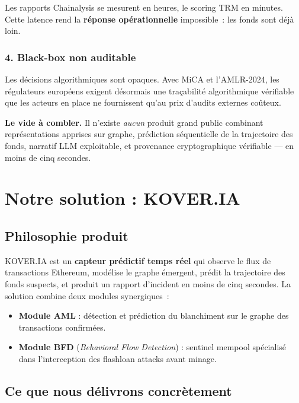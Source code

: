 \documentclass[11pt,a4paper]{article}
\begin{document}
Les rapports Chainalysis se mesurent en heures, le scoring TRM en
minutes. Cette latence rend la \textbf{réponse opérationnelle}
impossible~: les fonds sont déjà loin.

\subsubsection{4. Black-box non auditable}

Les décisions algorithmiques sont opaques. Avec MiCA et l'AMLR-2024,
les régulateurs européens exigent désormais une traçabilité
algorithmique vérifiable que les acteurs en place ne fournissent qu'au
prix d'audits externes coûteux.

\begin{insight}
\textbf{Le vide à combler.} Il n'existe \emph{aucun} produit grand
public combinant représentations apprises sur graphe, prédiction
séquentielle de la trajectoire des fonds, narratif LLM exploitable,
et provenance cryptographique vérifiable --- en moins de cinq secondes.
\end{insight}

\section{Notre solution : KOVER.IA}

\subsection{Philosophie produit}

\textsc{KOVER.IA} est un \textbf{capteur prédictif temps réel} qui
observe le flux de transactions Ethereum, modélise le graphe émergent,
prédit la trajectoire des fonds suspects, et produit un rapport
d'incident en moins de cinq secondes. La solution combine deux modules
synergiques~:

\begin{itemize}
  \item \textbf{Module AML} : détection et prédiction du blanchiment
        sur le graphe des transactions confirmées.
  \item \textbf{Module BFD} (\emph{Behavioral Flow Detection}) :
        sentinel mempool spécialisé dans l'interception des flashloan
        attacks avant minage.
\end{itemize}

\subsection{Ce que nous délivrons concrètement}
\end{document}
